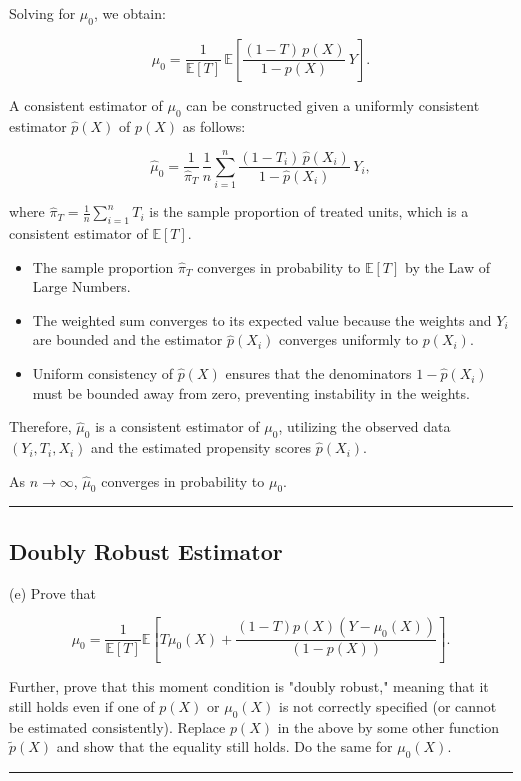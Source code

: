 \documentclass{article}
\newenvironment{colorparagraph}[1]{\par\color{#1}}{\par}
\begin{document}
Solving for \(\mu_0\), we obtain:

\[
\mu_0 = \frac{1}{\mathbb{E}[T]} \, \mathbb{E}\left[ \frac{(1 - T) \, p(X)}{1 - p(X)} \, Y \right].
\]

A consistent estimator of \(\mu_0\) can be constructed given a uniformly consistent estimator \(\hat{p}(X)\) of \( p(X) \) as follows:

\[
\hat{\mu}_0 = \frac{1}{\hat{\pi}_T} \, \frac{1}{n} \sum_{i=1}^n \frac{(1 - T_i) \, \hat{p}(X_i)}{1 - \hat{p}(X_i)} \, Y_i,
\]

where \(\hat{\pi}_T = \frac{1}{n} \sum_{i=1}^n T_i\) is the sample proportion of treated units, which is a consistent estimator of \(\mathbb{E}[T]\).

\begin{itemize}
    \item The sample proportion \(\hat{\pi}_T\) converges in probability to \(\mathbb{E}[T]\) by the Law of Large Numbers.
    \item The weighted sum converges to its expected value because the weights and \(Y_i\) are bounded and the estimator \(\hat{p}(X_i)\) converges uniformly to \(p(X_i)\).
    \item Uniform consistency of \(\hat{p}(X)\) ensures that the denominators \(1 - \hat{p}(X_i)\) must be bounded away from zero, preventing instability in the weights.
\end{itemize}

Therefore, \(\hat{\mu}_0\) is a consistent estimator of \(\mu_0\), utilizing the observed data \((Y_i, T_i, X_i)\) and the estimated propensity scores \(\hat{p}(X_i)\).

As $n \to \infty$, $\hat{\mu}_0$ converges in probability to $\mu_0$.

\begin{colorparagraph}{questioncolor}
\rule{\textwidth}{0.5pt}

\label{q2e}\subsection{Doubly Robust Estimator}
(e) Prove that 

\[
\mu_0 = \frac{1}{\mathbb{E}[T]} \mathbb{E} \left[ T \mu_0(X) + \frac{(1 - T)p(X)(Y - \mu_0(X))}{(1 - p(X))} \right].
\]

Further, prove that this moment condition is "doubly robust," meaning that it still holds even if one of \( p(X) \) or \( \mu_0(X) \) is not correctly specified (or cannot be estimated consistently). Replace \( p(X) \) in the above by some other function \( \tilde{p}(X) \) and show that the equality still holds. Do the same for \( \mu_0(X) \).

\rule{\textwidth}{0.5pt}
\end{colorparagraph}
\end{document}
